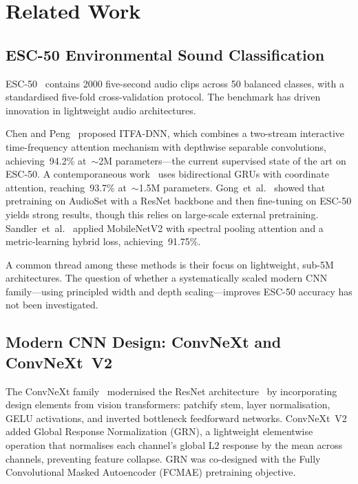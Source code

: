 \documentclass{article}
\begin{document}
\section{Related Work}

\subsection{ESC-50 Environmental Sound Classification}

ESC-50~\cite{piczark2015esc50} contains 2000 five-second audio clips across 50
balanced classes, with a standardised five-fold cross-validation protocol. The
benchmark has driven innovation in lightweight audio architectures.

Chen and Peng~\cite{chen2025itfa} proposed ITFA-DNN, which combines a
two-stream interactive time-frequency attention mechanism with depthwise
separable convolutions, achieving~94.2\% at~$\sim$2M parameters---the current
supervised state of the art on ESC-50. A contemporaneous
work~\cite{crnncoordatt2026} uses bidirectional GRUs with coordinate
attention, reaching~93.7\% at~$\sim$1.5M parameters. Gong~et~al.~\cite{gong2021psla}
showed that pretraining on AudioSet with a ResNet backbone and then fine-tuning
on ESC-50 yields strong results, though this relies on large-scale external
pretraining. Sandler~et~al.~\cite{mobilenetv2spa2025} applied MobileNetV2 with
spectral pooling attention and a metric-learning hybrid loss, achieving~91.75\%.

A common thread among these methods is their focus on lightweight, sub-5M
architectures. The question of whether a systematically scaled modern CNN
family---using principled width and depth scaling---improves ESC-50 accuracy has
not been investigated.

\subsection{Modern CNN Design: ConvNeXt and ConvNeXt~V2}

The ConvNeXt family~\cite{liu2022convnext} modernised the ResNet architecture~\cite{he2016resnet}
by incorporating design elements from vision transformers: patchify stem, layer
normalisation, GELU activations, and inverted bottleneck feedforward networks.
ConvNeXt~V2~\cite{woo2023convnextv2} added Global Response Normalization
(GRN), a lightweight elementwise operation that normalises each channel's global
L2 response by the mean across channels, preventing feature collapse. GRN was
co-designed with the Fully Convolutional Masked Autoencoder (FCMAE) pretraining
objective.
\end{document}
